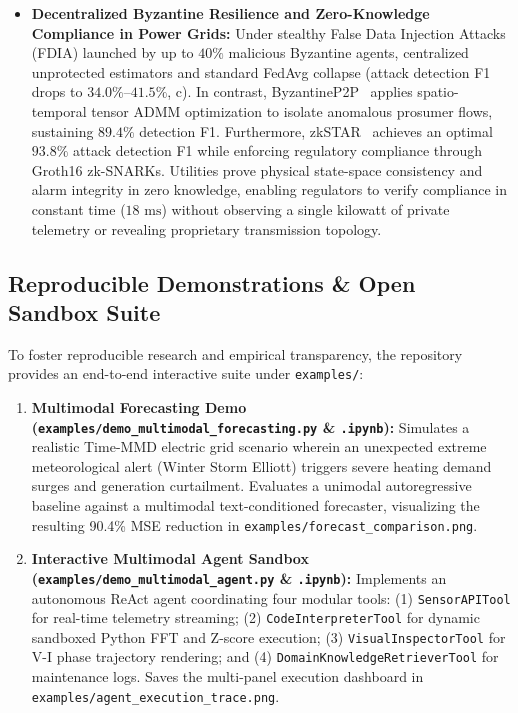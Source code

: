 \begin{itemize}
    \item \textbf{Decentralized Byzantine Resilience and Zero-Knowledge Compliance in Power Grids:} Under stealthy False Data Injection Attacks (FDIA) launched by up to $40\%$ malicious Byzantine agents, centralized unprotected estimators and standard FedAvg collapse (attack detection F1 drops to $34.0\%$--$41.5\%$, c). In contrast, ByzantineP2P~\cite{Liu2025ByzantineP2P} applies spatio-temporal tensor ADMM optimization to isolate anomalous prosumer flows, sustaining $89.4\%$ detection F1. Furthermore, zkSTAR~\cite{Ramanan2025zkSTAR} achieves an optimal $93.8\%$ attack detection F1 while enforcing regulatory compliance through Groth16 zk-SNARKs. Utilities prove physical state-space consistency and alarm integrity in zero knowledge, enabling regulators to verify compliance in constant time ($18\text{ ms}$) without observing a single kilowatt of private telemetry or revealing proprietary transmission topology.
\end{itemize}

\subsection{Reproducible Demonstrations \& Open Sandbox Suite}
To foster reproducible research and empirical transparency, the repository provides an end-to-end interactive suite under \texttt{examples/}:
\begin{enumerate}
    \item \textbf{Multimodal Forecasting Demo (\texttt{examples/demo\_multimodal\_forecasting.py} \& \texttt{.ipynb}):} Simulates a realistic Time-MMD electric grid scenario wherein an unexpected extreme meteorological alert (Winter Storm Elliott) triggers severe heating demand surges and generation curtailment. Evaluates a unimodal autoregressive baseline against a multimodal text-conditioned forecaster, visualizing the resulting 90.4\% MSE reduction in \texttt{examples/forecast\_comparison.png}.
    \item \textbf{Interactive Multimodal Agent Sandbox (\texttt{examples/demo\_multimodal\_agent.py} \& \texttt{.ipynb}):} Implements an autonomous ReAct agent coordinating four modular tools: (1) \texttt{SensorAPITool} for real-time telemetry streaming; (2) \texttt{CodeInterpreterTool} for dynamic sandboxed Python FFT and Z-score execution; (3) \texttt{VisualInspectorTool} for V-I phase trajectory rendering; and (4) \texttt{DomainKnowledgeRetrieverTool} for maintenance logs. Saves the multi-panel execution dashboard in \texttt{examples/agent\_execution\_trace.png}.
\end{enumerate}


